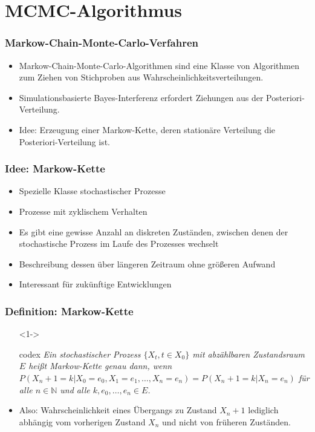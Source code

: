 \documentclass[aspectratio=169,xcolor=dvipsnames]{beamer}
\begin{document}
\section{MCMC-Algorithmus}
\begin{frame}
\frametitle{Markow-Chain-Monte-Carlo-Verfahren}
\begin{itemize}
	\item Markow-Chain-Monte-Carlo-Algorithmen sind eine Klasse von Algorithmen zum Ziehen von Stichproben aus Wahrscheinlichkeitsverteilungen.
	\item Simulationsbasierte Bayes-Interferenz erfordert Ziehungen aus der Posteriori-Verteilung.
	\item Idee: Erzeugung einer Markow-Kette, deren stationäre Verteilung die Posteriori-Verteilung ist.
\end{itemize}
\end{frame}

\begin{frame}
\frametitle{Idee: Markow-Kette}
\begin{itemize}
	\item<1-> Spezielle Klasse stochastischer Prozesse
	\item<2-> Prozesse mit zyklischem Verhalten
	\item<3-> Es gibt eine gewisse Anzahl an diskreten Zuständen, zwischen denen der stochastische Prozess im Laufe des Prozesses wechselt
	\item<4-> Beschreibung dessen über längeren Zeitraum ohne größeren Aufwand 
	\item<5-> Interessant für zukünftige Entwicklungen
\end{itemize}
\end{frame}

\begin{frame}
\frametitle{Definition: Markow-Kette}
\begin{itemize}
	\item[]<1-> 
	\begin{beamercolorbox}[sep=0.5em,wd=\textwidth,shadow=true,rounded=true]{codex}
		\textit{Ein stochastischer Prozess $\lbrace X_t,t \in X_0 \rbrace$ mit abzählbaren Zustandsraum $E$ heißt Markow-Kette genau dann, wenn $P(X_n+1 =k \vert X_0 =e_0 ,X_1 =e_1 ,\dots,X_n =e_n )=P(X_n+1 =k \vert X_n =e_n)$ für alle $n\in \mathbb{N}$ und alle $k,e_0 ,\dots,e_n \in E$.}
	\end{beamercolorbox}
	\item<2-> Also: Wahrscheinlichkeit eines Übergangs zu Zustand \(X_n+1\)
	lediglich abhängig vom vorherigen Zustand $X_n$ und nicht von früheren Zuständen.
\end{itemize}
\end{frame}
\end{document}
